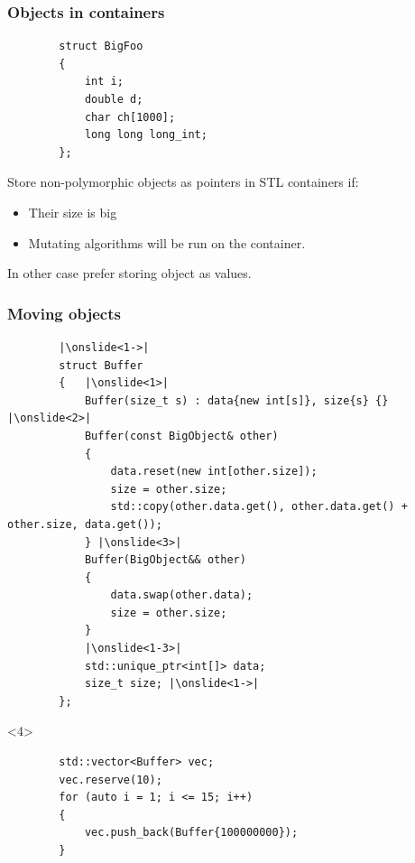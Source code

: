 \documentclass{beamer}
\begin{document}
\begin{frame}[fragile,t]
\frametitle{Objects in containers}
    \begin{lstlisting}
        struct BigFoo
        {
            int i;
            double d;
            char ch[1000];
            long long long_int;
        };
    \end{lstlisting}

\end{frame}

\begin{frame}
    Store non-polymorphic objects as pointers in STL containers if:
    \begin{itemize}
        \item Their size is big
        \item Mutating algorithms will be run on the container.
    \end{itemize}
    In other case prefer storing object as values.
\end{frame}

\begin{frame}[fragile,t]
\frametitle {Moving objects}
    \begin{lstlisting}
        |\onslide<1->|
        struct Buffer
        {   |\onslide<1>|
            Buffer(size_t s) : data{new int[s]}, size{s} {} |\onslide<2>|
            Buffer(const BigObject& other)
            {
                data.reset(new int[other.size]);
                size = other.size;
                std::copy(other.data.get(), other.data.get() + other.size, data.get());
            } |\onslide<3>|
            Buffer(BigObject&& other)
            {
                data.swap(other.data);
                size = other.size;
            }
            |\onslide<1-3>|
            std::unique_ptr<int[]> data;
            size_t size; |\onslide<1->|
        };
    \end{lstlisting}
    \begin{onlyenv}<4>
    \begin{lstlisting}
        std::vector<Buffer> vec;
        vec.reserve(10);
        for (auto i = 1; i <= 15; i++)
        {
            vec.push_back(Buffer{100000000});
        }
    \end{lstlisting}
    \end{onlyenv}
\end{frame}
\end{document}
